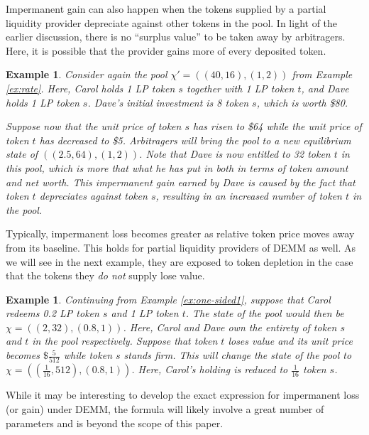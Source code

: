 \documentclass[12pt,a4paper]{article}
\newtheorem{example}[corollary]{Example}
\begin{document}
Impermanent gain can also happen when the tokens supplied by a partial liquidity provider depreciate against other tokens in the pool. In light of the earlier discussion, there is no ``surplus value'' to be taken away by arbitragers. Here, it is possible that the provider gains more of every deposited token.

\begin{example}\label{ex:one-sided2}
Consider again the pool $\chi'=((40,16),(1,2))$ from Example \ref{ex:rate}. Here, Carol holds 1 LP token $s$ together with 1 LP token $t$, and Dave holds 1 LP token $s$. Dave's initial investment is 8 token $s$, which is worth \$80.

Suppose now that the unit price of token $s$ has risen to \$64 while the unit price of token $t$ has decreased to \$5. Arbitragers will bring the pool to a new equilibrium state of $((2.5,64),(1,2))$. Note that Dave is now entitled to 32 token $t$ in this pool, which is more that what he has put in both in terms of token amount and net worth. This impermanent gain earned by Dave is caused by the fact that token $t$ depreciates against token $s$, resulting in an increased number of token $t$ in the pool.
\end{example}

Typically, impermanent loss becomes greater as relative token price moves away from its baseline. This holds for partial liquidity providers of DEMM as well. As we will see in the next example, they are exposed to token depletion in the case that the tokens they \emph{do not} supply lose value.

\begin{example}\label{ex:one-sided3}
Continuing from Example \ref{ex:one-sided1}, suppose that Carol redeems 0.2 LP token $s$ and 1 LP token $t$. The state of the pool would then be $\chi=((2,32),(0.8,1))$. Here, Carol and Dave own the entirety of token $s$ and $t$ in the pool respectively. Suppose that token $t$ loses value and its unit price becomes $\$\frac{5}{512}$ while token $s$ stands firm. This will change the state of the pool to $\chi=\left(\left(\frac{1}{16},512\right),(0.8,1)\right)$. Here, Carol's holding is reduced to $\frac{1}{16}$ token $s$.
\end{example}

While it may be interesting to develop the exact expression for impermanent loss (or gain) under DEMM, the formula will likely involve a great number of parameters and is beyond the scope of this paper.
\end{document}
